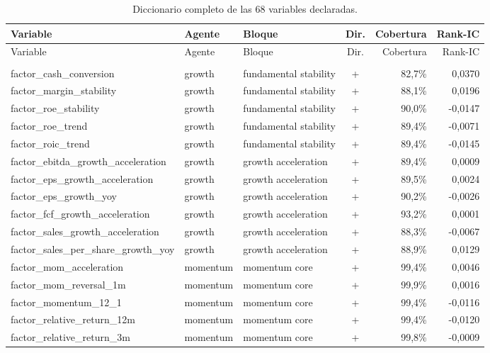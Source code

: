\begin{longtable}{@{}>{\raggedright\arraybackslash}p{4.9cm}>{\raggedright\arraybackslash}p{1.8cm}>{\raggedright\arraybackslash}p{2.8cm}crr@{}}
\caption{Diccionario completo de las 68 variables declaradas.}\label{tab:diccionario-features}\\
\toprule
Variable & Agente & Bloque & Dir. & Cobertura & Rank-IC \\
\midrule
\endfirsthead
\toprule
Variable & Agente & Bloque & Dir. & Cobertura & Rank-IC \\
\midrule
\endhead
\midrule
\multicolumn{6}{r}{\footnotesize Continúa en la página siguiente}\\
\endfoot
\bottomrule
\endlastfoot
factor\_cash\_conversion & growth & fundamental stability & + & 82,7\% & 0,0370 \\
factor\_margin\_stability & growth & fundamental stability & + & 88,1\% & 0,0196 \\
factor\_roe\_stability & growth & fundamental stability & + & 90,0\% & -0,0147 \\
factor\_roe\_trend & growth & fundamental stability & + & 89,4\% & -0,0071 \\
factor\_roic\_trend & growth & fundamental stability & + & 89,4\% & -0,0145 \\
factor\_ebitda\_growth\_acceleration & growth & growth acceleration & + & 89,4\% & 0,0009 \\
factor\_eps\_growth\_acceleration & growth & growth acceleration & + & 89,5\% & 0,0024 \\
factor\_eps\_growth\_yoy & growth & growth acceleration & + & 90,2\% & -0,0026 \\
factor\_fcf\_growth\_acceleration & growth & growth acceleration & + & 93,2\% & 0,0001 \\
factor\_sales\_growth\_acceleration & growth & growth acceleration & + & 88,3\% & -0,0067 \\
factor\_sales\_per\_share\_growth\_yoy & growth & growth acceleration & + & 88,9\% & 0,0129 \\
factor\_mom\_acceleration & momentum & momentum core & + & 99,4\% & 0,0046 \\
factor\_mom\_reversal\_1m & momentum & momentum core & + & 99,9\% & 0,0016 \\
factor\_momentum\_12\_1 & momentum & momentum core & + & 99,4\% & -0,0116 \\
factor\_relative\_return\_12m & momentum & momentum core & + & 99,4\% & -0,0120 \\
factor\_relative\_return\_3m & momentum & momentum core & + & 99,8\% & -0,0009 \\

\end{longtable}

